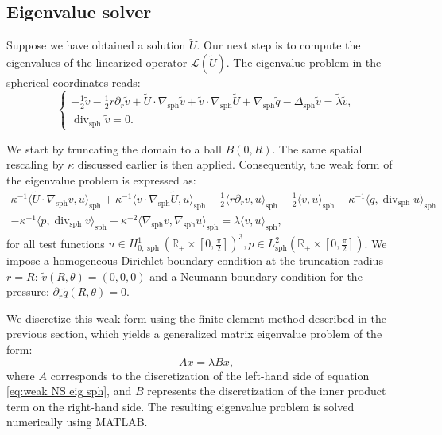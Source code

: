 \documentclass[11pt,a4paper]{article}
\numberwithin{equation}{section}
\newcommand{\cdummy}{\cdot}
\newcommand{\tmop}[1]{\ensuremath{\operatorname{#1}}}
\begin{document}
\subsection{Eigenvalue solver}\label{sec:eig}

Suppose we have obtained a solution $\widetilde{U}$. Our next step is to compute
the eigenvalues of the linearized operator $\mathcal{L} (\widetilde{U})$. The eigenvalue problem in the spherical coordinates reads:
\[ \left\{\begin{array}{l}
     - \frac{1}{2}  \widetilde{v} - \frac{1}{2} r \partial_r  \widetilde{v} +
     \widetilde{U} \cdot \nabla_{\tmop{sph}}  \widetilde{v} + \widetilde{v} \cdot
     \nabla_{\tmop{sph}}  \widetilde{U} + \nabla_{\tmop{sph}} \widetilde{q} -
     \Delta_{\tmop{sph}}  \widetilde{v} = \widetilde{\lambda}  \widetilde{v},\\
     \tmop{div}_{\tmop{sph}}  \widetilde{v} = 0.
   \end{array}\right. \]

We start
by truncating the domain to a ball $B (0, R)$. 
The same spatial rescaling by $\kappa$ discussed earlier is then applied. Consequently,
the weak form of the eigenvalue problem is expressed as:
\begin{equation}
  \begin{array}{l}
    \kappa^{-1} \langle \widetilde{U} \cdummy \nabla_{\tmop{sph}} v, u
    \rangle_{\tmop{sph}} + \kappa^{-1} \langle v \cdummy \nabla_{\tmop{sph}}
    \widetilde{U}, u \rangle_{\tmop{sph}} - \frac{1}{2} \langle r \partial_r v, u
    \rangle_{\tmop{sph}} - \frac{1}{2} \langle v, u \rangle_{\tmop{sph}} -
    \kappa^{-1} \langle q, \tmop{div}_{\tmop{sph}} u \rangle_{\tmop{sph}}\\
    - \kappa^{-1} \langle p, \tmop{div}_{\tmop{sph}} v \rangle_{\tmop{sph}} +
    \kappa^{-2} \langle \nabla_{\tmop{sph}} v, \nabla_{\tmop{sph}} u
    \rangle_{\tmop{sph}} = \lambda \langle v, u \rangle_{\tmop{sph}},
  \end{array} \label{eq:weak NS eig sph}
\end{equation}
for all test functions $u \in H^1_{0,\tmop{sph}} (\mathbb{R}_+ \times [0, \frac\pi2])^3, p
\in L^2_{\tmop{sph}} (\mathbb{R}_+ \times [0, \frac\pi2])$. We impose a homogeneous Dirichlet boundary condition at the truncation
  radius $r = R$: $\widetilde{v} (R, \theta) = (0, 0, 0)$ and a Neumann boundary condition for the pressure: $\partial_r\widetilde{q} (R, \theta)= 0$. 

We discretize this weak form using the finite element method described in the
previous section, which yields a generalized matrix eigenvalue problem of the
form:
\[ A x = \lambda B x, \]
where $A$ corresponds to the discretization of the left-hand side of equation
\eqref{eq:weak NS eig sph}, and $B$ represents the discretization of the inner
product term on the right-hand side. The resulting eigenvalue problem is
solved numerically using MATLAB.
\end{document}
